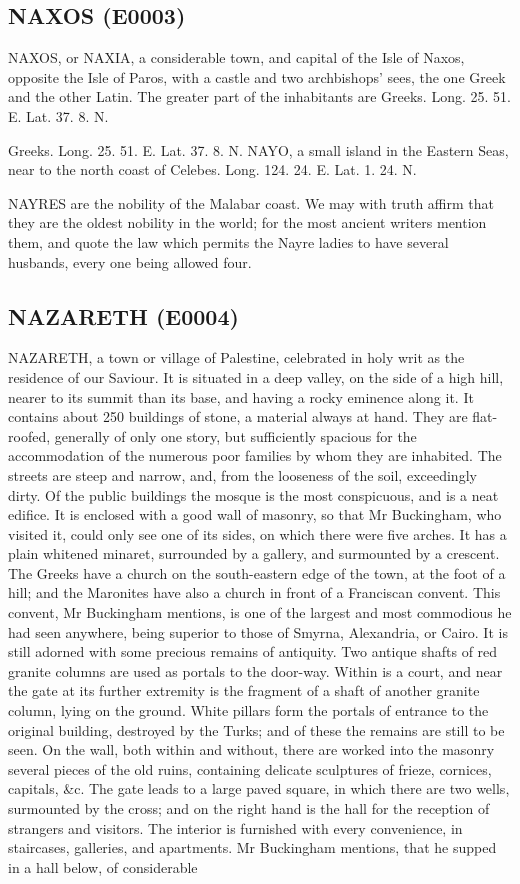 \documentclass{article}
\begin{document}
\subsection*{NAXOS (E0003)}
NAXOS, or NAXIA, a considerable town, and capital of the Isle of Naxos, opposite the Isle of Paros, with a castle and two archbishops' sees, the one Greek and the other Latin. The greater part of the inhabitants are Greeks. Long. 25. 51. E. Lat. 37. 8. N.

Greeks. Long. 25. 51. E. Lat. 37. 8. N.
NAYO, a small island in the Eastern Seas, near to the
north coast of Celebes. Long. 124. 24. E. Lat. 1. 24. N.

NAYRES are the nobility of the Malabar coast. We may with truth affirm that they are the oldest nobility in the world; for the most ancient writers mention them, and quote the law which permits the Nayre ladies to have several husbands, every one being allowed four.

\subsection*{NAZARETH (E0004)}
NAZARETH, a town or village of Palestine, celebrated in holy writ as the residence of our Saviour. It is situated in a deep valley, on the side of a high hill, nearer to its summit than its base, and having a rocky eminence along it. It contains about 250 buildings of stone, a material always at hand. They are flat-roofed, generally of only one story, but sufficiently spacious for the accommodation of the numerous poor families by whom they are inhabited. The streets are steep and narrow, and, from the looseness of the soil, exceedingly dirty. Of the public buildings the mosque is the most conspicuous, and is a neat edifice. It is enclosed with a good wall of masonry, so that Mr Buckingham, who visited it, could only see one of its sides, on which there were five arches. It has a plain whitened minaret, surrounded by a gallery, and surmounted by a crescent. The Greeks have a church on the south-eastern edge of the town, at the foot of a hill; and the Maronites have also a church in front of a Franciscan convent. This convent, Mr Buckingham mentions, is one of the largest and most commodious he had seen anywhere, being superior to those of Smyrna, Alexandria, or Cairo. It is still adorned with some precious remains of antiquity. Two antique shafts of red granite columns are used as portals to the door-way. Within is a court, and near the gate at its further extremity is the fragment of a shaft of another granite column, lying on the ground. White pillars form the portals of entrance to the original building, destroyed by the Turks; and of these the remains are still to be seen. On the wall, both within and without, there are worked into the masonry several pieces of the old ruins, containing delicate sculptures of frieze, cornices, capitals, \&c. The gate leads to a large paved square, in which there are two wells, surmounted by the cross; and on the right hand is the hall for the reception of strangers and visitors. The interior is furnished with every convenience, in staircases, galleries, and apartments. Mr Buckingham mentions, that he supped in a hall below, of considerable
\end{document}
